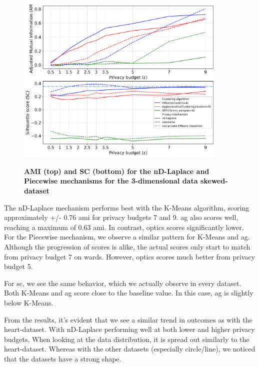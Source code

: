 \begin{figure}[H]
  \centering
  \caption{\textbf{AMI (top) and SC (bottom) for the nD-Laplace and Piecewise mechanisms for the 3-dimensional data skewed-dataset}}
  \includegraphics[width=0.9\textwidth]{Results/nd-laplace/nd-Laplace/skewed-dataset/ami-and-sc_3_dimensions.png}
  \label{fig:validation-skewed-dataset_comparison_3d-laplace}
\end{figure}
The nD-Laplace mechanism performs best with the K-Means algorithm, scoring approximately +/- 0.76 \gls{ami} for privacy budgets 7 and 9. \gls{ag} also scores well, reaching a maximum of 0.63 \gls{ami}. In contrast, \gls{optics} scores significantly lower.
For the Piecewise mechanism, we observe a similar pattern for K-Means and \gls{ag}. Although the progression of scores is alike, the actual scores only start to match from privacy budget 7 on wards. However, \gls{optics} scores much better from privacy budget 5.

For \gls{sc}, we see the same behavior, which we actually observe in every dataset. Both K-Means and \gls{ag} score close to the baseline value. In this case, \gls{ag} is slightly below K-Means.

From the results, it's evident that we see a similar trend in outcomes as with the heart-dataset. With nD-Laplace performing well at both lower and higher privacy budgets. When looking at the data distribution, it is spread out similarly to the heart-dataset. Whereas with the other datasets (especially circle/line), we noticed that the datasets have a strong shape.

\newpage
